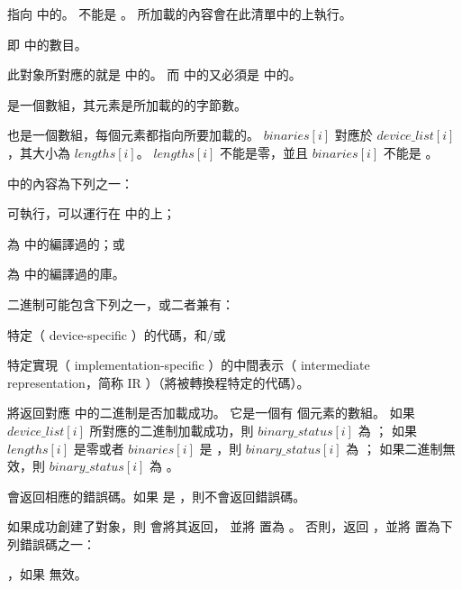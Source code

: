  指向  中的。
 不能是 。
所加載的內容會在此清單中的上執行。

 即  中的數目。

此對象所對應的就是  中的。
而  中的又必須是  中的。

 是一個數組，其元素是所加載的的字節數。

 也是一個數組，每個元素都指向所要加載的。
$binaries[i]$ 對應於 $device\_list[i]$，其大小為 $lengths[i]$。
$lengths[i]$ 不能是零，並且 $binaries[i]$ 不能是 。

 中的內容為下列之一：
\startigBase
\item 可執行，可以運行在  中的上；

\item 為  中的編譯過的；或

\item 為  中的編譯過的庫。
\stopigBase

二進制可能包含下列之一，或二者兼有：
\startigBase
\item 特定（ device-specific ）的代碼，和/或
\item 特定實現（ implementation-specific ）的中間表示（ intermediate representation，简称 IR ）（將被轉換程特定的代碼）。
\stopigBase

 將返回對應  中的二進制是否加載成功。
它是一個有  個元素的數組。
如果 $device\_list[i]$ 所對應的二進制加載成功，則 $binary\_status[i]$ 為 ；
如果 $lengths[i]$ 是零或者 $binaries[i]$ 是 ，則 $binary\_status[i]$ 為 ；
如果二進制無效，則 $binary\_status[i]$ 為 。

 會返回相應的錯誤碼。如果  是 ，則不會返回錯誤碼。

如果成功創建了對象，則  會將其返回，
並將  置為 。
否則，返回 ，並將  置為下列錯誤碼之一：
\startigBase
\item {}，如果  無效。

